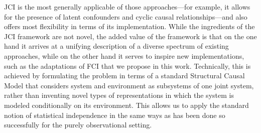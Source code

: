 \documentclass[twoside,11pt]{article}
\begin{document}
JCI is the most generally applicable of those approaches---for example, it allows for the
presence of latent confounders and cyclic causal relationships---and also offers most flexibility in terms of
its implementation. 
While the ingredients of the JCI framework are not novel, the added value of the 
framework is that on the one hand it 
arrives at a unifying description of a diverse spectrum of existing approaches, while on the 
other hand it serves to inspire new implementations, such as the adaptations of FCI that we
propose in this work. Technically, this is achieved by formulating the problem in terms of
a standard Structural Causal Model that considers system and environment as subsystems of one
joint system, rather than inventing novel types of representations in which the system is 
modeled conditionally on its environment. This allows us to apply the standard notion of 
statistical independence in the same ways as has been done so successfully for the
purely observational setting.
\end{document}
